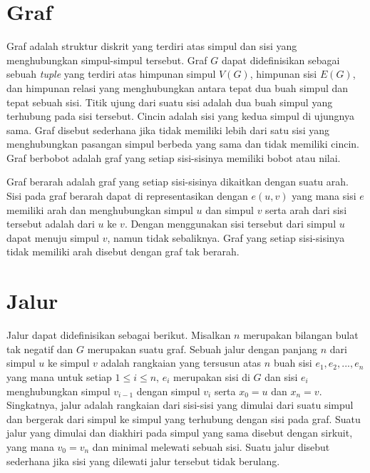 \medskip

\medskip

\medskip


\section{Graf}

Graf adalah struktur diskrit yang terdiri atas simpul dan sisi yang menghubungkan simpul-simpul tersebut. Graf $G$ dapat didefinisikan sebagai sebuah \textit{tuple} yang 
terdiri atas himpunan simpul $V(G)$, himpunan sisi $E(G)$, dan himpunan relasi yang menghubungkan antara tepat dua buah simpul dan tepat sebuah sisi. Titik ujung dari suatu sisi 
adalah dua buah simpul yang terhubung pada sisi tersebut. Cincin adalah sisi yang kedua simpul di ujungnya sama. Graf disebut sederhana jika tidak memiliki lebih 
dari satu sisi yang menghubungkan pasangan simpul berbeda yang sama dan tidak memiliki cincin. Graf berbobot adalah graf yang setiap sisi-sisinya memiliki bobot atau nilai.

Graf berarah adalah graf yang setiap sisi-sisinya dikaitkan dengan suatu arah. Sisi pada graf berarah 
dapat di representasikan dengan $e (u, v)$ yang mana sisi $e$ memiliki arah dan menghubungkan 
simpul $u$ dan simpul $v$ serta arah dari sisi tersebut adalah dari $u$ ke $v$. Dengan menggunakan 
sisi tersebut dari simpul $u$ dapat menuju simpul $v$, namun tidak sebaliknya. Graf yang setiap sisi-sisinya 
tidak memiliki arah disebut dengan graf tak berarah.

\section{Jalur}

Jalur dapat didefinisikan sebagai berikut. Misalkan $n$ merupakan bilangan bulat tak negatif dan $G$ merupakan suatu graf. Sebuah jalur dengan 
panjang $n$ dari simpul $u$ ke simpul $v$ adalah rangkaian yang tersusun atas $n$ buah sisi $e_{1}, e_{2}, ..., e_{n}$ yang mana untuk setiap $1 \leq i \leq n$, $e_{i}$ merupakan sisi 
di $G$ dan sisi $e_{i}$ menghubungkan simpul $v_{i-1}$ dengan simpul $v_{i}$ serta $x_{0} = u$ dan $x_{n} = v$. Singkatnya, jalur adalah rangkaian dari sisi-sisi yang dimulai dari 
suatu simpul dan bergerak dari simpul ke simpul yang terhubung dengan sisi pada graf. Suatu jalur yang dimulai dan diakhiri pada simpul yang sama disebut 
dengan sirkuit, yang mana $v_{0} = v_{n}$ dan minimal melewati sebuah sisi. Suatu jalur disebut sederhana jika sisi yang dilewati jalur tersebut tidak berulang.

